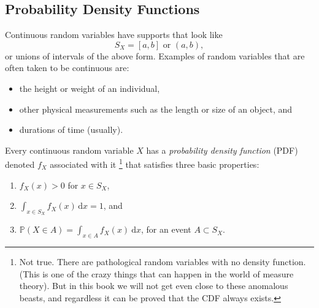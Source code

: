 \documentclass[captions=tableheading]{scrbook}
\begin{document}
\subsection{Probability Density Functions}
\label{sec-1-1-1}
\label{sub-probability-density-functions}


Continuous random variables have supports that look like
\begin{equation}
S_{X}=[a,b]\mbox{ or }(a,b),
\end{equation}
or unions of intervals of the above form. Examples of random variables that are often taken to be continuous are:

\begin{itemize}
\item the height or weight of an individual,
\item other physical measurements such as the length or size of an object, and
\item durations of time (usually).
\end{itemize}

Every continuous random variable \(X\) has a \emph{probability density function} (PDF) denoted \(f_{X}\) associated with it
\footnote{Not true. There are pathological random variables with no density function. (This is one of the crazy things that can happen in the world of measure theory). But in this book we will not get even close to these anomalous beasts, and regardless it can be proved that the CDF always exists.}
that satisfies three basic properties:
\begin{enumerate}
\item \(f_{X}(x)>0\) for \(x\in S_{X}\),
\item \(\int_{x\in S_{X}}f_{X}(x)\,\mathrm{d} x=1\), and
\item \(\mathbb{P}(X\in A)=\int_{x\in A}f_{X}(x)\:\mathrm{d} x\), for an event \(A\subset S_{X}\).
\end{enumerate}
\end{document}
